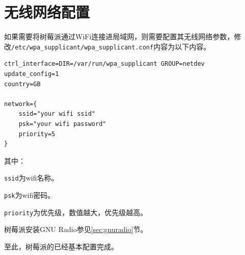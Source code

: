 	\section{无线网络配置}
		\par 如果需要将树莓派通过WiFi连接进局域网，则需要配置其无线网络参数，修改\lstinline[language=sh]{/etc/wpa_supplicant/wpa_supplicant.conf}内容为以下内容。
		\begin{lstlisting}
ctrl_interface=DIR=/var/run/wpa_supplicant GROUP=netdev
update_config=1
country=GB

network={
	ssid="your wifi ssid"
	psk="your wifi password"
	priority=5
}
		\end{lstlisting}
		\par 其中：
		\par \lstinline{ssid}为wifi名称。
		\par \lstinline{psk}为wifi密码。
		\par \lstinline{priority}为优先级，数值越大，优先级越高。
		\par 树莓派安装GNU Radio参见\ref{sec:gnuradio}节。
		\par 至此，树莓派的已经基本配置完成。
